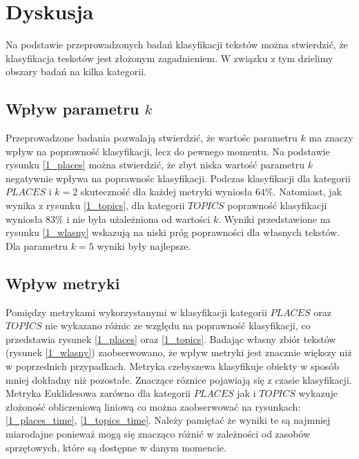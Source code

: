 \documentclass{classrep}
\begin{document}
\subsubsection{}


\section{Dyskusja}
Na podstawie przeprowadzonych badań klasyfikacji tekstów można stwierdzić, że klasyfikacja teskstów
jest złożonym zagadnieniem. W związku z tym dzielimy obszary badań na kilka kategorii.

\subsection{Wpływ parametru $k$}
Przeprowadzone badania pozwalają stwierdzić, że wartośc parametru $k$ ma znaczy wpływ na poprawność
klasyfikacji, lecz do pewnego momentu. Na podstawie rysunku \ref{1_places} można stwierdzić, że
zbyt niska wartość parametru $k$ negatywnie wpływa na poprawnośc klasyfikacji. Podczas klasyfikacji
dla kategorii $PLACES$ i $k=2$ skuteczność dla każdej metryki wyniosła $64\%$. Natomiast, jak wynika
z rysunku \ref{1_topics}, dla
kategorii $TOPICS$ poprawność klasyfikacji wyniosła $83\%$ i nie była użależniona od wartości $k$.
Wyniki przedstawione na rysunku \ref{1_wlasny} wskazują na niski próg poprawności dla własnych tekstów.
Dla parametru $k=5$ wyniki były najlepsze.


\subsection{Wpływ metryki}
Pomiędzy metrykami wykorzystanymi w klasyfikacji kategorii $PLACES$ oraz $TOPICS$ nie wykazano
różnic ze względu na
poprawność klasyfikacji, co przedstawia rysunek \ref{1_places} oraz \ref{1_topics}. Badając własny
zbiór tekstów (rysunek \ref{1_wlasny}) zaobserwowano, że wpływ metryki jest znacznie większy niż w poprzednich przypadkach.
Metryka czebyszewa klasyfikuje obiekty w sposób mniej dokładny niż pozostałe.
Znaczące róznice
pojawiają się z czasie klasyfikacji. Metryka Euklidesowa zarówno dla kategorii $PLACES$ jak i $TOPICS$
wykazuje złożoność obliczeniową liniową co można zaobserwować na rysunkach: \ref{1_places_time},
\ref{1_topics_time}. Należy pamiętać że wyniki te są najmniej miarodajne ponieważ mogą się znacząco
różnić w zależności od zasobów sprzętowych, które są dostępne w danym momencie.
\end{document}
